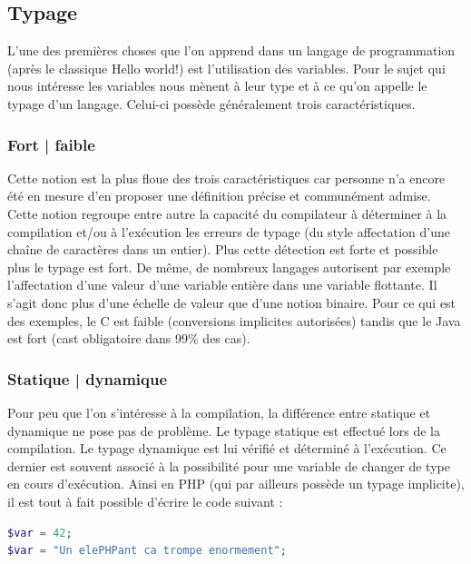 \subsection{Typage}
\label{typage}

L'une des premières choses que l'on apprend dans un langage de programmation (après le classique Hello world!) est l'utilisation des variables. Pour le sujet qui nous intéresse les variables nous mènent à leur type et à ce qu'on appelle le typage d'un langage. Celui-ci possède généralement trois caractéristiques. \cite{bib_wiki_typage}

\subsubsection{Fort | faible}
\label{fort_faible}

Cette notion est la plus floue des trois caractéristiques car personne n'a encore été en mesure d'en proposer une définition précise et communément admise. Cette notion regroupe entre autre la capacité du compilateur à déterminer à la compilation et/ou à l'exécution les erreurs de typage (du style affectation d'une chaîne de caractères dans un entier). Plus cette détection est forte et possible plus le typage est fort. De même, de nombreux langages autorisent par exemple l'affectation d'une valeur d'une variable entière dans une variable flottante. Il s'agit donc plus d'une échelle de valeur que d'une notion binaire. Pour ce qui est des exemples, le C est faible (conversions implicites autorisées) tandis que le Java est fort (cast obligatoire dans 99\% des cas).

\subsubsection{Statique | dynamique}
\label{statique_dynamique}

Pour peu que l'on s'intéresse à la compilation, la différence entre statique et dynamique ne pose pas de problème. Le typage statique est effectué lors de la compilation. Le typage dynamique est lui vérifié et déterminé à l'exécution. Ce dernier est souvent associé à la possibilité pour une variable de changer de type en cours d'exécution. Ainsi en PHP (qui par ailleurs possède un typage implicite), il est tout à fait possible d'écrire le code suivant :

\begin{lstlisting}[language=php]
$var = 42;
$var = "Un elePHPant ca trompe enormement";
\end{lstlisting}

